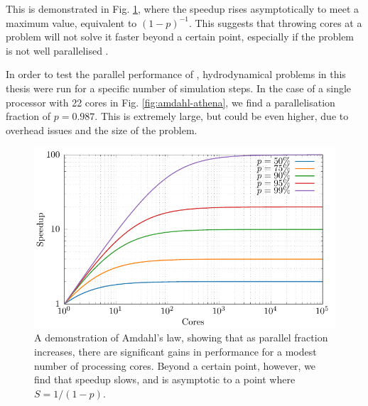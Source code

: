 \noindent
This is demonstrated in Fig. \ref{fig:amdahl-demonstration}, where the speedup rises asymptotically to meet a maximum value, equivalent to $(1-p)^{-1}$.
This suggests that throwing cores at a problem will not solve it faster beyond a certain point, especially if the problem is not well parallelised \parencite[Ch.~2]{trobecIntroductionParallelComputing2018}.

In order to test the parallel performance of \athena{}, hydrodynamical problems in this thesis were run for a specific number of simulation steps.
In the case of a single processor with 22 cores in Fig. \ref{fig:amdahl-athena}, we find a parallelisation fraction of $p=0.987$.
This is extremely large, but could be even higher, due to overhead issues and the size of the problem.

\begin{figure}[ht]
  \centering
  \includegraphics{assets/Amdahl/amdahl.pdf}
  \caption[Demonstration of Amhdal's law]{A demonstration of Amdahl's law, showing that as parallel fraction increases, there are significant gains in performance for a modest number of processing cores. Beyond a certain point, however, we find that speedup slows, and is asymptotic to a point where $S = 1/(1-p)$.}
  \label{fig:amdahl-demonstration}
\end{figure}

